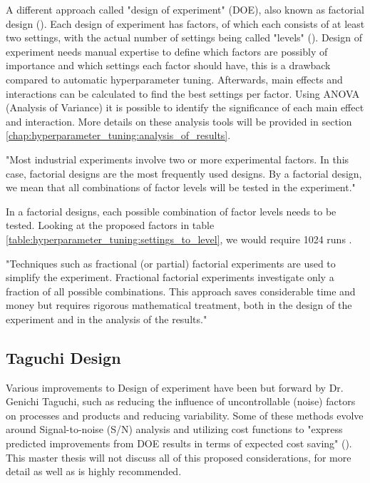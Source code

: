 A different approach called "design of experiment" (DOE), also known as factorial design (\cite{roy_primer_1990}). Each design of experiment has factors, of which each consists of at least two settings, with the actual number of settings being called "levels" (\cite{yang_design_2009}). Design of experiment needs manual expertise to define which factors are possibly of importance and which settings each factor should have, this is a drawback compared to automatic hyperparameter tuning. Afterwards, main effects and interactions can be calculated to find the best settings per factor. Using ANOVA (Analysis of Variance) it is possible to identify the significance of each main effect and interaction. More details on these analysis tools will be provided in section \ref{chap:hyperparameter_tuning:analysis_of_results}.

"Most industrial experiments involve two or more experimental factors. In this case, factorial designs are the most frequently used designs. By a factorial design, we mean that all combinations of factor levels will be tested in the experiment."\cite{yang_design_2009}


In a factorial designs, each possible combination of factor levels needs to be tested. Looking at the proposed factors in table \ref{table:hyperparameter_tuning:settings_to_level}, we would require 1024 runs .

"Techniques such as fractional (or partial) factorial experiments are used to simplify the experiment. Fractional factorial experiments investigate only a fraction of all possible combinations. This approach saves considerable time and money but requires rigorous mathematical treatment, both in the design of the experiment and in the analysis of the results." \cite{roy_primer_1990} 


\subsection{Taguchi Design}
Various improvements to Design of experiment have been but forward by Dr. Genichi Taguchi, such as reducing the influence of uncontrollable (noise) factors on processes and products and reducing variability. Some of these methods evolve around Signal-to-noise (S/N) analysis and utilizing cost functions to "express predicted improvements from DOE results in terms of expected cost saving" (\cite{roy_primer_1990}). This master thesis will not discuss all of this proposed considerations, for more detail \cite{roy_primer_1990} as well as \cite{yang_design_2009} is highly recommended.

